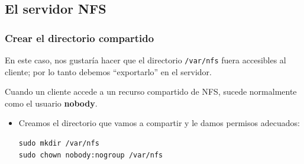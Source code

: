 \documentclass[a4paper,11pt]{article}
\begin{document}
\subsection{El servidor NFS}
\subsubsection{Crear el directorio compartido}
En este caso, nos gustaría hacer que el directorio \texttt{/var/nfs} fuera
accesibles al cliente; por lo tanto  debemos ``exportarlo'' en el servidor.

Cuando un cliente accede a un recurso compartido de NFS, sucede normalmente como
el usuario \textbf{nobody}. 

    \begin{itemize}
      \item Creamos el directorio que vamos a compartir y le damos permisos
            adecuados:
\begin{verbatim}
sudo mkdir /var/nfs
sudo chown nobody:nogroup /var/nfs
\end{verbatim}
\end{itemize}
\end{document}
